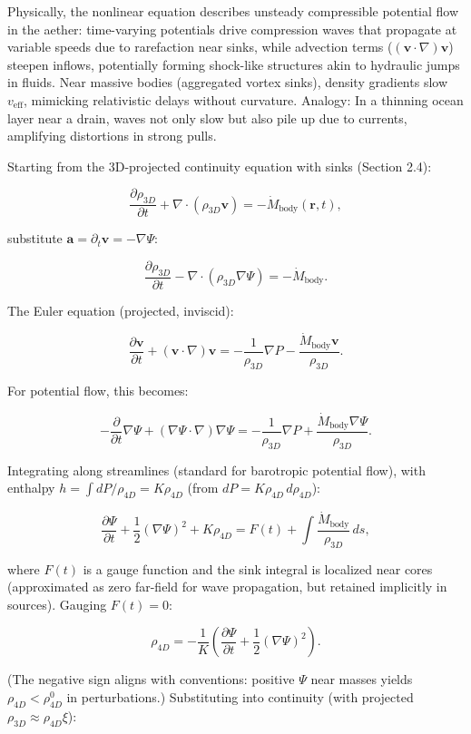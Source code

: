 \documentclass{article}
\begin{document}
Physically, the nonlinear equation describes unsteady compressible potential flow in the aether: time-varying potentials drive compression waves that propagate at variable speeds due to rarefaction near sinks, while advection terms ($( \mathbf{v} \cdot \nabla ) \mathbf{v}$) steepen inflows, potentially forming shock-like structures akin to hydraulic jumps in fluids. Near massive bodies (aggregated vortex sinks), density gradients slow $v_{\text{eff}}$, mimicking relativistic delays without curvature. Analogy: In a thinning ocean layer near a drain, waves not only slow but also pile up due to currents, amplifying distortions in strong pulls.

Starting from the 3D-projected continuity equation with sinks (Section 2.4):

\[
\frac{\partial \rho_{3D}}{\partial t} + \nabla \cdot (\rho_{3D} \mathbf{v}) = -\dot{M}_{\text{body}}(\mathbf{r}, t),
\]

substitute $\mathbf{a} = \partial_t \mathbf{v} = -\nabla \Psi$:

\[
\frac{\partial \rho_{3D}}{\partial t} - \nabla \cdot (\rho_{3D} \nabla \Psi) = -\dot{M}_{\text{body}}.
\]

The Euler equation (projected, inviscid):

\[
\frac{\partial \mathbf{v}}{\partial t} + (\mathbf{v} \cdot \nabla) \mathbf{v} = -\frac{1}{\rho_{3D}} \nabla P - \frac{\dot{M}_{\text{body}} \mathbf{v}}{\rho_{3D}}.
\]

For potential flow, this becomes:

\[
-\frac{\partial}{\partial t} \nabla \Psi + (\nabla \Psi \cdot \nabla) \nabla \Psi = -\frac{1}{\rho_{3D}} \nabla P + \frac{\dot{M}_{\text{body}} \nabla \Psi}{\rho_{3D}}.
\]

Integrating along streamlines (standard for barotropic potential flow), with enthalpy $h = \int dP / \rho_{4D} = K \rho_{4D}$ (from $dP = K \rho_{4D} \, d\rho_{4D}$):

\[
\frac{\partial \Psi}{\partial t} + \frac{1}{2} (\nabla \Psi)^2 + K \rho_{4D} = F(t) + \int \frac{\dot{M}_{\text{body}}}{\rho_{3D}} \, ds,
\]

where $F(t)$ is a gauge function and the sink integral is localized near cores (approximated as zero far-field for wave propagation, but retained implicitly in sources). Gauging $F(t) = 0$:

\[
\rho_{4D} = -\frac{1}{K} \left( \frac{\partial \Psi}{\partial t} + \frac{1}{2} (\nabla \Psi)^2 \right).
\]

(The negative sign aligns with conventions: positive $\Psi$ near masses yields $\rho_{4D} < \rho_{4D}^0$ in perturbations.) Substituting into continuity (with projected $\rho_{3D} \approx \rho_{4D} \xi$):
\end{document}
